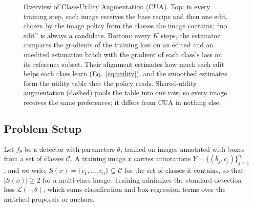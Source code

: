 \begin{figure}[t]
\caption{Overview of Class-Utility Augmentation (CUA). Top: in every training step, each image receives the base recipe and then one edit, chosen by the image policy from the classes the image contains; ``no edit'' is always a candidate. Bottom: every $K$ steps, the estimator compares the gradients of the training loss on an edited and an unedited estimation batch with the gradient of each class's loss on its reference subset. Their alignment estimates how much each edit helps each class learn (Eq.~\eqref{eq:utility}), and the smoothed estimates form the utility table that the policy reads. Shared-utility augmentation (dashed) pools the table into one row, so every image receives the same preferences; it differs from CUA in nothing else.}
\label{fig:framework}
\end{figure}

\subsection{Problem Setup}
\label{sec:method_setup}

Let $f_\theta$ be a detector with parameters $\theta$, trained on images annotated with boxes from a set of classes $\mathcal{C}$. A training image $x$ carries annotations $Y=\{(b_j,c_j)\}_{j=1}^{n}$, and we write $S(x)=\{c_1,\dots,c_n\}\subseteq\mathcal{C}$ for the set of classes it contains, so that $|S(x)|\geq 2$ for a multi-class image. Training minimizes the standard detection loss $\mathcal{L}(\cdot\,;\theta)$, which sums classification and box-regression terms over the matched proposals or anchors.

